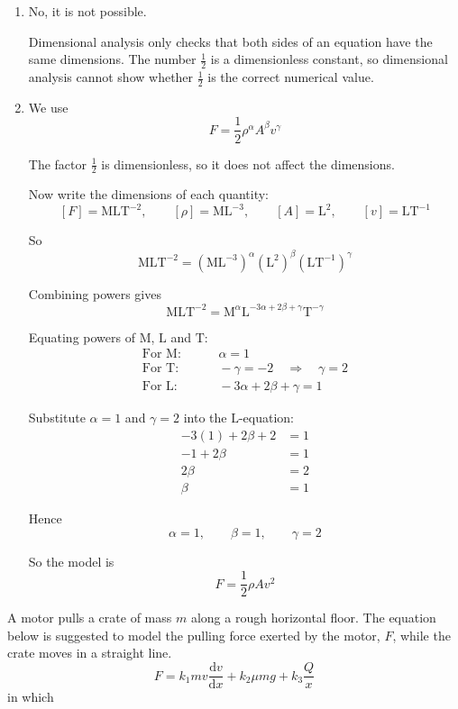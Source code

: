 \documentclass[leqno]{article}
\begin{document}
\begin{enumerate}[
  label=\textbf{\arabic*.},
  leftmargin=*,
  topsep=0pt,
  partopsep=0pt,
  parsep=0pt
]
\begin{djsSolution}
\begin{enumerate}[label=\textbf{(\alph*)}, start=1]
  \item No, it is not possible.

Dimensional analysis only checks that both sides of an equation have the same dimensions. The number \(\tfrac12\) is a dimensionless constant, so dimensional analysis cannot show whether \(\tfrac12\) is the correct numerical value.

  \item We use
\[
F=\frac12\rho^{\alpha}A^{\beta}v^{\gamma}
\]

The factor \(\tfrac12\) is dimensionless, so it does not affect the dimensions.

Now write the dimensions of each quantity:
\[
[F]=\mathrm{MLT^{-2}},\qquad [\rho]=\mathrm{ML^{-3}},\qquad [A]=\mathrm{L^2},\qquad [v]=\mathrm{LT^{-1}}
\]

So
\[
\mathrm{MLT^{-2}}=(\mathrm{ML^{-3}})^{\alpha}(\mathrm{L^2})^{\beta}(\mathrm{LT^{-1}})^{\gamma}
\]

Combining powers gives
\[
\mathrm{MLT^{-2}}=\mathrm{M}^{\alpha}\mathrm{L}^{-3\alpha+2\beta+\gamma}\mathrm{T}^{-\gamma}
\]

Equating powers of \(\mathrm{M}\), \(\mathrm{L}\) and \(\mathrm{T}\):
\begin{align*}
\text{For }\mathrm{M}:&\qquad \alpha=1 \\
\text{For }\mathrm{T}:&\qquad -\gamma=-2\quad\Longrightarrow\quad\gamma=2 \\
\text{For }\mathrm{L}:&\qquad -3\alpha+2\beta+\gamma=1
\end{align*}

Substitute \(\alpha=1\) and \(\gamma=2\) into the \(\mathrm{L}\)-equation:
\begin{align*}
-3(1)+2\beta+2&=1 \\
-1+2\beta&=1 \\
2\beta&=2 \\
\beta&=1
\end{align*}

Hence
\[
\alpha=1,\qquad \beta=1,\qquad \gamma=2
\]

So the model is
\[
F=\frac12\rho Av^2
\]
\end{enumerate}
\end{djsSolution}


\newpage

\questionitem

A motor pulls a crate of mass $m$ along a rough horizontal floor. The equation below is suggested to model the pulling force exerted by the motor, $F$, while the crate moves in a straight line.
\[
F = k_1 m v\dfrac{\mathrm{d}v}{\mathrm{d}x} + k_2 \mu mg + k_3 \dfrac{Q}{x}
\]
in which \\


\end{enumerate}
\end{document}

